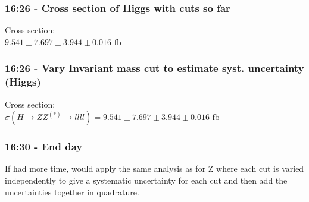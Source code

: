 \subsubsection{16:26 - Cross section of Higgs with cuts so far}
Cross section:
\\
$9.541 \pm 7.697 \pm 3.944 \pm 0.016 \text{ fb}$

\subsubsection{16:26 - Vary Invariant mass cut to estimate syst. uncertainty (Higgs)}
Cross section:
\\
$\sigma(H \rightarrow Z Z^{(*)} \rightarrow llll) = 9.541 \pm 7.697 \pm 3.944 \pm 0.016 \text{ fb}$

\subsubsection{16:30 - End day}
If had more time, would apply the same analysis as for Z where each cut is varied independently to give a systematic uncertainty for each cut and then add the uncertainties together in quadrature.

